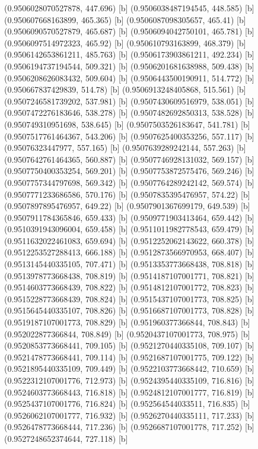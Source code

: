 {{{(0.9506028070527878, 447.696) [b] 
(0.9506038487194545, 448.585) [b] 
(0.950607668163899, 465.365) [b] 
(0.9506087098305657, 465.41) [b] 
(0.9506090570527879, 465.687) [b] 
(0.9506094042750101, 465.781) [b] 
(0.9506097514972323, 465.92) [b] 
(0.950610793163899, 468.379) [b] 
(0.9506142653861211, 485.763) [b] 
(0.9506173903861211, 492.234) [b] 
(0.9506194737194544, 509.321) [b] 
(0.9506201681638988, 509.438) [b] 
(0.9506208626083432, 509.604) [b] 
(0.9506443500190911, 514.772) [b] 
(0.950667837429839, 514.78) [b] 
(0.9506913248405868, 515.561) [b] 
(0.9507246581739202, 537.981) [b] 
(0.9507430609516979, 538.051) [b] 
(0.9507472276183646, 538.278) [b] 
(0.9507482692850313, 538.528) [b] 
(0.950749310951698, 538.645) [b] 
(0.9507503526183647, 541.781) [b] 
(0.9507517761464367, 543.206) [b] 
(0.9507625400353256, 557.117) [b] 
(0.95076323447977, 557.165) [b] 
(0.9507639289242144, 557.263) [b] 
(0.9507642761464365, 560.887) [b] 
(0.9507746928131032, 569.157) [b] 
(0.9507750400353254, 569.201) [b] 
(0.9507753872575476, 569.246) [b] 
(0.9507757344797698, 569.342) [b] 
(0.9507764289242142, 569.574) [b] 
(0.9507771233686586, 570.176) [b] 
(0.9507835395476957, 574.22) [b] 
(0.9507897895476957, 649.22) [b] 
(0.9507901367699179, 649.539) [b] 
(0.9507911784365846, 659.433) [b] 
(0.9509771903413464, 659.442) [b] 
(0.9510391943096004, 659.458) [b] 
(0.9511011982778543, 659.479) [b] 
(0.9511632022461083, 659.694) [b] 
(0.9512252062143622, 660.378) [b] 
(0.9512253527288413, 666.188) [b] 
(0.9512873566970953, 668.407) [b] 
(0.9513145440335105, 707.471) [b] 
(0.9513353773668438, 708.818) [b] 
(0.9513978773668438, 708.819) [b] 
(0.9514187107001771, 708.821) [b] 
(0.9514603773668439, 708.822) [b] 
(0.9514812107001772, 708.823) [b] 
(0.9515228773668439, 708.824) [b] 
(0.9515437107001773, 708.825) [b] 
(0.9515645440335107, 708.826) [b] 
(0.9516687107001773, 708.828) [b] 
(0.9519187107001773, 708.829) [b] 
(0.951960377366844, 708.843) [b] 
(0.952022877366844, 708.849) [b] 
(0.9520437107001773, 708.975) [b] 
(0.9520853773668441, 709.105) [b] 
(0.9521270440335108, 709.107) [b] 
(0.9521478773668441, 709.114) [b] 
(0.9521687107001775, 709.122) [b] 
(0.9521895440335109, 709.449) [b] 
(0.9522103773668442, 710.659) [b] 
(0.9522312107001776, 712.973) [b] 
(0.9524395440335109, 716.816) [b] 
(0.9524603773668443, 716.818) [b] 
(0.9524812107001777, 716.819) [b] 
(0.9525437107001776, 716.824) [b] 
(0.952564544033511, 716.835) [b] 
(0.9526062107001777, 716.932) [b] 
(0.9526270440335111, 717.233) [b] 
(0.9526478773668444, 717.236) [b] 
(0.9526687107001778, 717.252) [b] 
(0.9527248652374644, 727.118) [b] 
}}}
